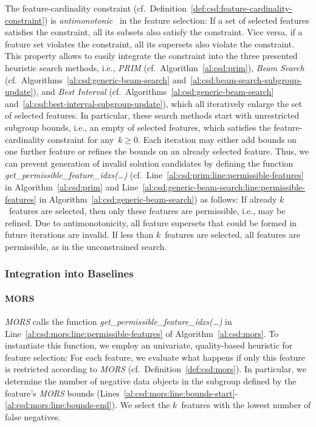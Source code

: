 \documentclass{article}
\theoremstyle{definition}
\begin{document}
The feature-cardinality constraint (cf.~Definition~\ref{def:csd:feature-cardinality-constraint}) is \emph{antimonotonic}~\cite{ng1998exploratory} in the feature selection:
If a set of selected features satisfies the constraint, all its subsets also satisfy the constraint.
Vice versa, if a feature set violates the constraint, all its supersets also violate the constraint.
This property allows to easily integrate the constraint into the three presented heuristic search methods, i.e., \emph{PRIM} (cf.~Algorithm~\ref{al:csd:prim}), \emph{Beam Search} (cf.~Algorithms~\ref{al:csd:generic-beam-search} and~\ref{al:csd:beam-search-subgroup-update}), and \emph{Best Interval} (cf.~Algorithms~\ref{al:csd:generic-beam-search} and~\ref{al:csd:best-interval-subgroup-update}), which all iteratively enlarge the set of selected features.
In particular, these search methods start with unrestricted subgroup bounds, i.e., an empty of selected features, which satisfies the feature-cardinality constraint for any~$k \geq 0$.
Each iteration may either add bounds on one further feature or refines the bounds on an already selected feature.
Thus, we can prevent generation of invalid solution candidates by defining the function \emph{get\_permissible\_feature\_idxs(\dots)} (cf.~Line~\ref{al:csd:prim:line:permissible-features} in Algorithm~\ref{al:csd:prim} and Line~\ref{al:csd:generic-beam-search:line:permissible-features} in Algorithm~\ref{al:csd:generic-beam-search}) as follows:
If already $k$~features are selected, then only these features are permissible, i.e., may be refined.
Due to antimonotonicity, all feature supersets that could be formed in future iterations are invalid.
If less than $k$~features are selected, all features are permissible, as in the unconstrained search.

\subsubsection{Integration into Baselines}
\label{sec:csd:approach:cardinality:baselines}

\paragraph{MORS}

\emph{MORS} calls the function \emph{get\_permissible\_feature\_idxs(\dots)} in Line~\ref{al:csd:mors:line:permissible-features} of Algorithm~\ref{al:csd:mors}.
To instantiate this function, we employ an univariate, quality-based heuristic for feature selection:
For each feature, we evaluate what happens if only this feature is restricted according to \emph{MORS} (cf.~Definition~\ref{def:csd:mors}).
In particular, we determine the number of negative data objects in the subgroup defined by the feature's \emph{MORS} bounds (Lines~\ref{al:csd:mors:line:bounds-start}-\ref{al:csd:mors:line:bounds-end}).
We select the $k$~features with the lowest number of false negatives.
\end{document}
